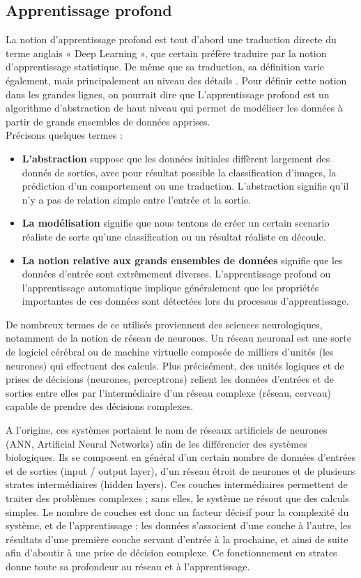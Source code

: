 \documentclass[12pt]{article}
\begin{document}
\subsection{Apprentissage profond}
La notion d’apprentissage profond est tout d’abord une traduction directe du terme anglais « Deep Learning », que certain préfère traduire par la notion d’apprentissage statistique. De même que sa traduction, sa définition varie également, mais principalement au niveau des détails \cite{10}. %
Pour définir cette notion dans les grandes lignes, on pourrait dire que L’apprentissage profond est un algorithme d'abstraction de haut niveau qui permet de modéliser les données à partir de grands ensembles de données apprises.\\
Précisons quelques termes \cite{10}:
\begin{itemize}
	\item \textbf{L'abstraction} suppose que les données initiales diffèrent largement des donnés de sorties, avec pour résultat possible la classification d’images, la prédiction d’un comportement ou une traduction. L'abstraction signifie qu'il n'y a pas de relation simple entre l'entrée et la sortie.
	\item \textbf{La modélisation} signifie que nous tentons de créer un certain scenario réaliste de sorte qu'une classification ou un résultat réaliste en découle.
	\item \textbf{La notion relative aux grands ensembles de données} signifie que les données d’entrée sont extrêmement diverses. L'apprentissage profond ou l'apprentissage automatique implique généralement que les propriétés importantes de ces données sont détectées lors du processus d'apprentissage.
\end{itemize}

De nombreux termes de ce utilisés proviennent des sciences neurologiques, notamment de la notion de réseau de neurones. Un réseau neuronal est une sorte de logiciel cérébral ou de machine virtuelle composée de milliers d’unités (les neurones) qui effectuent des calculs. Plus précisément, des unités logiques et de prises de décisions (neurones, perceptrons) relient les données d’entrées et de sorties entre elles par l’intermédiaire d’un réseau complexe (réseau, cerveau) capable de prendre des décisions complexes.

A l'origine, ces systèmes portaient le nom de réseaux artificiels de neurones (ANN, Artificial Neural Networks) afin de les différencier des systèmes biologiques. Ils se composent en général d’un certain nombre de données d'entrées et de sorties (input / output layer), d’un réseau étroit de neurones et de plusieurs strates intermédiaires (hidden layers). Ces couches intermédiaires permettent de traiter des problèmes complexes ; sans elles, le système ne résout que des calculs simples. Le nombre de couches est donc un facteur décisif pour la complexité du système, et de l’apprentissage ; les données s’associent d’une couche à l’autre, les résultats d’une première couche servant d’entrée à la prochaine, et ainsi de suite afin d’aboutir à une prise de décision complexe. Ce fonctionnement en strates donne toute sa profondeur au réseau et à l’apprentissage.
\end{document}
